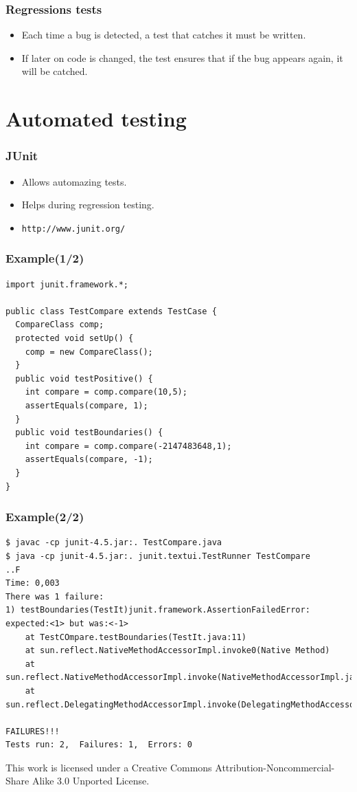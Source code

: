 \documentclass[10pt]{beamer}
\begin{document}
\begin{frame}[fragile]
  \frametitle{Regressions tests}
  \begin{itemize}
    \item Each time a bug is detected, a test that catches it must be written.
    \item If later on code is changed, the test ensures that if the bug appears
      again, it will be catched.
  \end{itemize}
\end{frame}

\section{Automated testing}
\begin{frame}[fragile]
  \frametitle{JUnit}
  \begin{itemize}
    \item Allows automazing tests.
    \item Helps during regression testing.
    \item \verb!http://www.junit.org/!
  \end{itemize}
\end{frame}

\begin{frame}[fragile]
  \frametitle{Example(1/2)}
\begin{verbatim}
import junit.framework.*;

public class TestCompare extends TestCase {
  CompareClass comp;
  protected void setUp() {
    comp = new CompareClass();
  }
  public void testPositive() {
    int compare = comp.compare(10,5);
    assertEquals(compare, 1);
  }
  public void testBoundaries() {
    int compare = comp.compare(-2147483648,1);
    assertEquals(compare, -1);
  }
}
\end{verbatim}
\end{frame}

\begin{frame}
  \frametitle{Example(2/2)}
\tiny
\begin{verbatim}
$ javac -cp junit-4.5.jar:. TestCompare.java
$ java -cp junit-4.5.jar:. junit.textui.TestRunner TestCompare
..F
Time: 0,003
There was 1 failure:
1) testBoundaries(TestIt)junit.framework.AssertionFailedError: expected:<1> but was:<-1>
	at TestCOmpare.testBoundaries(TestIt.java:11)
	at sun.reflect.NativeMethodAccessorImpl.invoke0(Native Method)
	at sun.reflect.NativeMethodAccessorImpl.invoke(NativeMethodAccessorImpl.java:39)
	at sun.reflect.DelegatingMethodAccessorImpl.invoke(DelegatingMethodAccessorImpl.java:25)

FAILURES!!!
Tests run: 2,  Failures: 1,  Errors: 0
\end{verbatim}
\end{frame}

\begin{frame}[fragile]

    \tiny

  \begin{center}
        This work is licensed under a Creative Commons Attribution-Noncommercial-Share Alike 3.0 Unported License.
  \end{center}
\end{frame}
\end{document}
